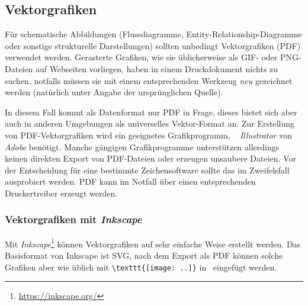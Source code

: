 \subsection{Vektorgrafiken}

Für schematische Abbildungen (\zB Flussdiagramme, Entity-Relationship-Diagramme
oder sonstige strukturelle Darstellungen) sollten unbedingt
Vektorgrafiken (PDF) verwendet werden. %
Gerasterte Grafiken, wie sie üblicherweise als GIF- oder PNG-Dateien
auf Webseiten vorliegen, haben in einem Druckdokument nichts zu suchen, notfalls
müssen sie mit einem entsprechenden Werkzeug \emph{neu} gezeichnet werden (natürlich
unter Angabe der ursprünglichen Quelle).

In diesem Fall kommt als Datenformat nur PDF %
in Frage,
dieses bietet sich aber auch in anderen Umgebungen als universelles
Vektor-Format an.
Zur Erstellung von PDF-Vektorgrafiken wird ein geeignetes
Grafikprogramm, \zB\ %
\emph{Illustrator} von \emph{Adobe} benötigt.
Manche gängigen Grafikprogramme 
unterstützen allerdings keinen direkten Export von PDF-Dateien
oder erzeugen unsaubere Dateien. Vor der Entscheidung
für eine bestimmte Zeichensoftware sollte das im Zweifelsfall
ausprobiert werden.
PDF kann im Notfall über einen entsprechenden Druckertreiber erzeugt werden.


\subsubsection{Vektorgrafiken mit \emph{Inkscape}}
\label{sec:InkscapeGraphics}

Mit \emph{Inkscape}\footnote{\url{https://inkscape.org/}} können Vektorgrafiken auf
sehr einfache Weise erstellt werden.
Das Basisformat von Inkscape ist SVG,
nach dem Export als PDF können solche Grafiken aber wie üblich mit
\verb!\texttt{[image: ..]}! in \latex\ eingefügt werden.

